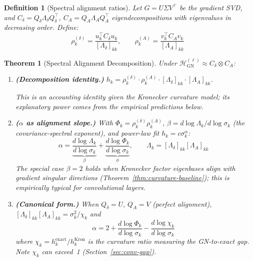 \documentclass{article}
\newtheorem{theorem}{Theorem}
\newtheorem{definition}{Definition}
\begin{document}
\begin{definition}[Spectral alignment ratios]\label{def:alignment}
Let $G = U\Sigma V^\top$ be the gradient SVD, and $C_\delta = Q_\delta \Lambda_\delta Q_\delta^\top$, $C_A = Q_A \Lambda_A Q_A^\top$ eigendecompositions with eigenvalues in decreasing order. Define:
\[
    \rho_k^{(\delta)} = \frac{u_k^\top C_\delta u_k}{[\Lambda_\delta]_{kk}}, \qquad
    \rho_k^{(A)} = \frac{v_k^\top C_A v_k}{[\Lambda_A]_{kk}}
\]
\end{definition}

\begin{theorem}[Spectral Alignment Decomposition]\label{thm:spectral-alignment}
Under $\mathcal{H}_{\mathrm{GN}}^{(\ell)} \approx C_\delta \otimes C_A$:
\begin{enumerate}[leftmargin=*,nosep]
    \item \textbf{(Decomposition identity.)}
    $h_k = \rho_k^{(\delta)} \cdot \rho_k^{(A)} \cdot [\Lambda_\delta]_{kk} \cdot [\Lambda_A]_{kk}$.

    This is an accounting identity given the Kronecker curvature model; its explanatory power comes from the empirical predictions below.
    \item \textbf{($\alpha$ as alignment slope.)} With $\Phi_k = \rho_k^{(\delta)}\rho_k^{(A)}$, $\beta = d\log\Lambda_k / d\log\sigma_k$ (the covariance-spectral exponent), and power-law fit $h_k = c\sigma_k^\alpha$:
    \begin{equation}\label{eq:alpha-decomp}
        \alpha = \underbrace{\frac{d \log \Lambda_k}{d \log \sigma_k}}_{\displaystyle\beta} + \underbrace{\frac{d \log \Phi_k}{d \log \sigma_k}}_{\displaystyle\phi}, \qquad \Lambda_k = [\Lambda_\delta]_{kk}[\Lambda_A]_{kk}
    \end{equation}
    The special case $\beta = 2$ holds when Kronecker factor eigenbases align with gradient singular directions (Theorem~\ref{thm:curvature-baseline}); this is empirically typical for convolutional layers.
    \item \textbf{(Canonical form.)} When $Q_\delta = U$, $Q_A = V$ (perfect alignment), $[\Lambda_\delta]_{kk}[\Lambda_A]_{kk} = \sigma_k^2/\chi_k$ and
    \begin{equation}\label{eq:alpha-general}
        \alpha = 2 + \frac{d \log \Phi_k}{d \log \sigma_k} - \frac{d \log \chi_k}{d \log \sigma_k}
    \end{equation}
    where $\chi_k = h_k^{\mathrm{exact}}/h_k^{\mathrm{Kron}}$ is the \emph{curvature ratio} measuring the GN-to-exact gap. Note $\chi_k$ can exceed~1 (Section~\ref{sec:conv-gap}).
\end{enumerate}
\end{theorem}
\end{document}
